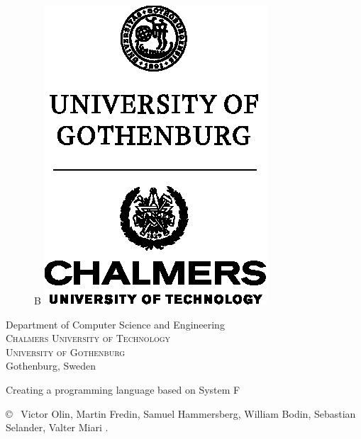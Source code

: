 \begin{center}
\begin{figure}[H]
    \fi
    \if\ThesisType B
    \includegraphics[width=0.23\pdfpagewidth]{figure/auxiliary/cth_uog_logo.eps} \\
    \fi
	\end{figure}	\vspace{5mm}	
	
	Department of Computer Science and Engineering \\
	\textsc{Chalmers University of Technology} \\
	\textsc{University of Gothenburg} \\
	Gothenburg, Sweden \the\year \\
\end{center}


\newpage
\thispagestyle{plain}
\vspace*{4.5cm}
Creating a programming language based on System F\\
\setlength{\parskip}{1cm}

\copyright ~ Victor Olin, Martin Fredin, Samuel Hammersberg, William Bodin, Sebastian Selander, Valter Miari \the\year. \setlength{\parskip}{1cm}

